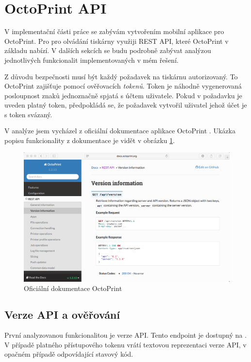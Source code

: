 \section{OctoPrint API}

V implementační části práce se zabývám vytvořením mobilní aplikace pro OctoPrint.
Pro pro olvádání tiskárny využiji REST API, které OctoPrint v základu nabízí.
V dalších sekcích se budu podrobně zabývat analýzou jednotlivých funkcionalit implementovaných v mém řešení.

Z důvodu bezpečnosti musí být každý požadavek na tiskárnu autorizovaný.
To OctoPrint zajišťuje pomocí ověřovacích \textit{tokenů}.
Token je náhodně vygenerovaná posloupnost znaků jednoznačně spjatá s účtem uživatele.
Pokud v požadavku je uveden platný token, předpokládá se, že požadavek vytvořil uživatel jehož účet je s token svázaný.

V analýze jsem vycházel z oficiální dokumentace aplikace OctoPrint \cite{octoprint-docs}.
Ukázka popisu funkcionality z dokumentace je vidět v obrázku \ref{fig:octoprint-docs}.

\begin{figure}\centering
	\includegraphics[width=\textwidth]{assets/analysis-octoprintapi-web.png}
	\caption{Oficiální dokumentace OctoPrint}\label{fig:octoprint-docs}
\end{figure}

\subsection{Verze API a ověřování}

První analyzovanou funkcionalitou je verze API.
Tento endpoint je dostupný na .
V případě platného přístupového tokenu vrátí textovou reprezentaci verze API, v opačném případě odpovídající stavový kód.


